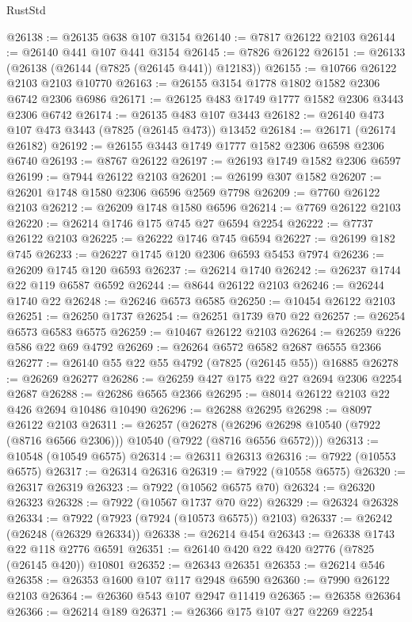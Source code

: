 \begin{lexlean}{RustStd}
\begin{coremodule}
@26138 := @26135 @638 @107 @3154
@26140 := @7817 @26122 @2103
@26144 := @26140 @441 @107 @441 @3154
@26145 := @7826 @26122
@26151 := @26133 (@26138 (@26144 (@7825 (@26145 @441)) @12183))
@26155 := @10766 @26122 @2103 @2103 @10770
@26163 := @26155 @3154 @1778 @1802 @1582 @2306 @6742 @2306 @6986
@26171 := @26125 @483 @1749 @1777 @1582 @2306 @3443 @2306 @6742
@26174 := @26135 @483 @107 @3443
@26182 := @26140 @473 @107 @473 @3443 (@7825 (@26145 @473)) @13452
@26184 := @26171 (@26174 @26182)
@26192 := @26155 @3443 @1749 @1777 @1582 @2306 @6598 @2306 @6740
@26193 := @8767 @26122
@26197 := @26193 @1749 @1582 @2306 @6597
@26199 := @7944 @26122 @2103
@26201 := @26199 @307 @1582
@26207 := @26201 @1748 @1580 @2306 @6596 @2569 @7798
@26209 := @7760 @26122 @2103
@26212 := @26209 @1748 @1580 @6596
@26214 := @7769 @26122 @2103
@26220 := @26214 @1746 @175 @745 @27 @6594 @2254
@26222 := @7737 @26122 @2103
@26225 := @26222 @1746 @745 @6594
@26227 := @26199 @182 @745
@26233 := @26227 @1745 @120 @2306 @6593 @5453 @7974
@26236 := @26209 @1745 @120 @6593
@26237 := @26214 @1740
@26242 := @26237 @1744 @22 @119 @6587 @6592
@26244 := @8644 @26122 @2103
@26246 := @26244 @1740 @22
@26248 := @26246 @6573 @6585
@26250 := @10454 @26122 @2103
@26251 := @26250 @1737
@26254 := @26251 @1739 @70 @22
@26257 := @26254 @6573 @6583 @6575
@26259 := @10467 @26122 @2103
@26264 := @26259 @226 @586 @22 @69 @4792
@26269 := @26264 @6572 @6582 @2687 @6555 @2366
@26277 := @26140 @55 @22 @55 @4792 (@7825 (@26145 @55)) @16885
@26278 := @26269 @26277
@26286 := @26259 @427 @175 @22 @27 @2694 @2306 @2254 @2687
@26288 := @26286 @6565 @2366
@26295 := @8014 @26122 @2103 @22 @426 @2694 @10486 @10490
@26296 := @26288 @26295
@26298 := @8097 @26122 @2103
@26311 := @26257
    (@26278 (@26296 @26298 @10540 (@7922 (@8716 @6566 @2306))) @10540 (@7922 (@8716 @6556 @6572)))
@26313 := @10548 (@10549 @6575)
@26314 := @26311 @26313
@26316 := @7922 (@10553 @6575)
@26317 := @26314 @26316
@26319 := @7922 (@10558 @6575)
@26320 := @26317 @26319
@26323 := @7922 (@10562 @6575 @70)
@26324 := @26320 @26323
@26328 := @7922 (@10567 @1737 @70 @22)
@26329 := @26324 @26328
@26334 := @7922 (@7923 (@7924 (@10573 @6575)) @2103)
@26337 := @26242 (@26248 (@26329 @26334))
@26338 := @26214 @454
@26343 := @26338 @1743 @22 @118 @2776 @6591
@26351 := @26140 @420 @22 @420 @2776 (@7825 (@26145 @420)) @10801
@26352 := @26343 @26351
@26353 := @26214 @546
@26358 := @26353 @1600 @107 @117 @2948 @6590
@26360 := @7990 @26122 @2103
@26364 := @26360 @543 @107 @2947 @11419
@26365 := @26358 @26364
@26366 := @26214 @189
@26371 := @26366 @175 @107 @27 @2269 @2254

\end{coremodule}
\end{lexlean}
